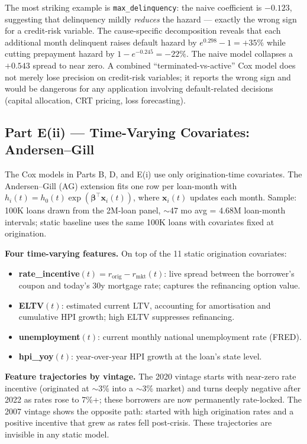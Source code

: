 \documentclass[11pt,a4paper]{article}
\begin{document}
The most striking example is \texttt{max\_delinquency}: the naive coefficient is $-0.123$, suggesting that delinquency mildly \emph{reduces} the hazard --- exactly the wrong sign for a credit-risk variable. The cause-specific decomposition reveals that each additional month delinquent raises default hazard by $e^{0.298}-1 = +35\%$ while cutting prepayment hazard by $1 - e^{-0.245} = -22\%$. The naive model collapses a $+0.543$ spread to near zero. A combined ``terminated-vs-active'' Cox model does not merely lose precision on credit-risk variables; it reports the wrong sign and would be dangerous for any application involving default-related decisions (capital allocation, CRT pricing, loss forecasting).

\subsection{Part E(ii) --- Time-Varying Covariates: Andersen--Gill}

The Cox models in Parts B, D, and E(i) use only origination-time covariates. The Andersen--Gill (AG) extension fits one row per loan-month with $h_i(t) = h_0(t)\exp(\boldsymbol{\beta}^\top \mathbf{x}_i(t))$, where $\mathbf{x}_i(t)$ updates each month. Sample: 100K loans drawn from the 2M-loan panel, $\sim$47 mo avg = 4.68M loan-month intervals; static baseline uses the same 100K loans with covariates fixed at origination.

\textbf{Four time-varying features.} On top of the 11 static origination covariates:
\begin{itemize}[leftmargin=1.2em,itemsep=2pt,topsep=2pt]
  \item \textbf{rate\_incentive}$(t) = r_{\text{orig}} - r_{\text{mkt}}(t)$: live spread between the borrower's coupon and today's 30y mortgage rate; captures the refinancing option value.
  \item \textbf{ELTV}$(t)$: estimated current LTV, accounting for amortisation and cumulative HPI growth; high ELTV suppresses refinancing.
  \item \textbf{unemployment}$(t)$: current monthly national unemployment rate (FRED).
  \item \textbf{hpi\_yoy}$(t)$: year-over-year HPI growth at the loan's state level.
\end{itemize}

\textbf{Feature trajectories by vintage.} The 2020 vintage starts with near-zero rate incentive (originated at $\sim$3\% into a $\sim$3\% market) and turns deeply negative after 2022 as rates rose to 7\%+; these borrowers are now permanently rate-locked. The 2007 vintage shows the opposite path: started with high origination rates and a positive incentive that grew as rates fell post-crisis. These trajectories are invisible in any static model.
\end{document}
